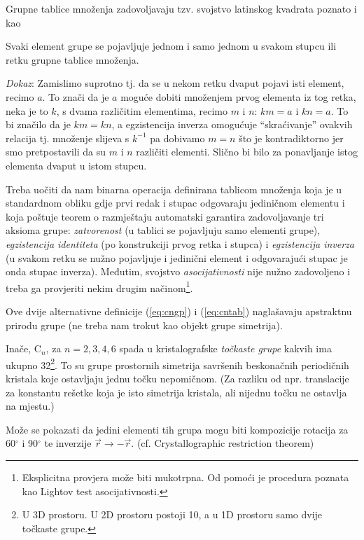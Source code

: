 \begin{primjer}
Grupne tablice množenja zadovoljavaju tzv. svojstvo latinskog
kvadrata poznato i kao
\begin{teorem}
Svaki element grupe se pojavljuje jednom i samo jednom u svakom stupcu
ili retku grupne tablice množenja.
\end{teorem}

\emph{Dokaz}: Zamislimo suprotno tj. da se u nekom retku
dvaput pojavi isti element, recimo $a$. To znači da je $a$ moguće
dobiti množenjem prvog elementa iz tog retka, neka je to $k$, s
dvama različitim elementima, recimo $m$ i $n$: $km=a$ i $kn=a$. To bi značilo
da je $km=kn$, a egzistencija inverza omogućuje ``skraćivanje''
ovakvih relacija tj. množenje slijeva s $k^{-1}$ pa
dobivamo $m=n$ što je kontradiktorno jer smo pretpostavili da su
$m$ i $n$ različiti elementi. Slično bi bilo za ponavljanje istog
elementa dvaput u istom stupcu.

Treba uočiti da nam binarna operacija definirana tablicom množenja
koja je u standardnom obliku gdje prvi redak i stupac odgovaraju
jediničnom elementu i koja poštuje teorem o razmještaju automatski 
garantira zadovoljavanje tri aksioma grupe: 
\emph{zatvorenost} (u tablici se pojavljuju samo elementi grupe), 
\emph{egzistencija identiteta} (po konstrukciji prvog retka i stupca) i
\emph{egzistencija inverza} (u svakom retku se nužno pojavljuje i 
jedinični element i odgovarajući stupac je onda stupac inverza).
Međutim, svojstvo \emph{asocijativnosti} nije nužno zadovoljeno
i treba ga provjeriti nekim drugim načinom\footnote{Eksplicitna provjera
može biti mukotrpna. Od pomoći je procedura poznata kao Lightov
test asocijativnosti.}.


Ove dvije alternativne definicije (\ref{eq:cngp}) i (\ref{eq:cntab}) 
naglašavaju apstraktnu prirodu grupe (ne treba
nam trokut kao objekt grupe simetrija).

Inače, C$_n$, za $n=2,3,4,6$ spada u kristalografske \emph{točkaste grupe} kakvih
ima ukupno 32\footnote{U 3D prostoru. U 2D prostoru postoji 10, a u
1D prostoru samo dvije točkaste grupe.}. 
To su grupe prostornih simetrija savršenih beskonačnih
periodičnih kristala koje ostavljaju jednu točku nepomičnom. (Za
razliku od npr. translacije za konstantu rešetke koja je isto simetrija
kristala, ali nijednu točku ne ostavlja na mjestu.)
  
Može se pokazati da jedini elementi tih grupa mogu biti kompozicije
rotacija za 60$^\circ$ i 90$^\circ$ te inverzije $\vec{r}\to -\vec{r}$.
(cf. Crystallographic restriction theorem)
   
\end{primjer}



